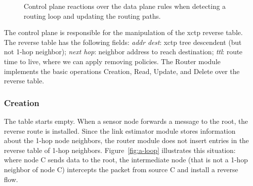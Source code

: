 \begin{figure}[!ht]
\centerline{
\qquad
\qquad \qquad
\qquad
} \caption{Control plane reactions over the data plane rules when
detecting a routing loop and updating the routing paths.}
\label{fig:loop}
\end{figure}

The control plane is responsible for the manipulation of the
\ac{xctp} reverse table. The reverse table has the following fields:
\textit{addr dest}: \ac{xctp} tree descendent (but not 1-hop
neighbor); \textit{next hop}: neighbor address to reach destination;
\textit{\acs{ttl}}: route time to live, where we can apply removing
policies. The Router module implements the basic operations
Creation, Read, Update, and Delete over the reverse table.

\subsubsection{Creation} The table starts empty. When a sensor node forwards a message to the
root, the reverse route is installed. Since the link estimator
module stores information about the 1-hop node neighbors, the router
module does not insert entries in the reverse table of 1-hop
neighbors. Figure~\ref{fig:a-loop} illustrates this situation: where
node C sends data to the root, the intermediate node (that is not a
1-hop neighbor of node C) intercepts the packet from source C and
install a reverse flow.

